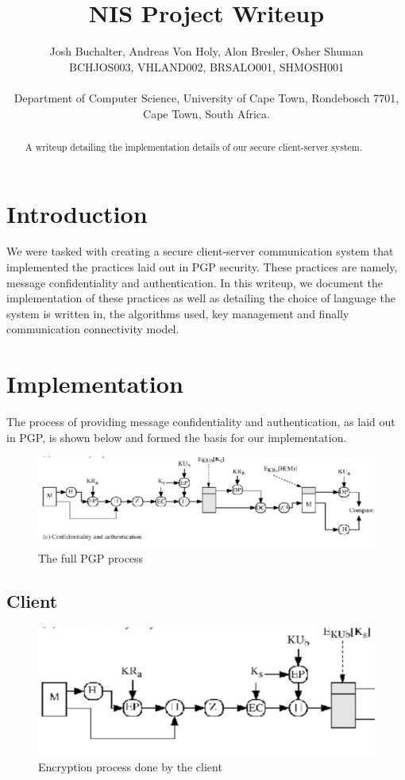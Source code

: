 \documentclass[a4paper,10pt]{article}
\title{\bf NIS Project Writeup}
\author{Josh Buchalter, Andreas Von Holy, Alon Bresler, Osher Shuman \\
BCHJOS003, VHLAND002, BRSALO001, SHMOSH001 \\\\
Department of Computer Science, University of Cape Town, Rondebosch 7701, \\Cape Town, South Africa.}
\begin{document}
\maketitle

\begin{abstract}
A writeup detailing the implementation details of our secure client-server system.
\end{abstract}

\section{Introduction}
We were tasked with creating a secure client-server communication system that implemented the practices laid out in PGP security. These practices are namely, message confidentiality and authentication. In this writeup, we document the implementation of these practices as well as detailing the choice of language the system is written in, the algorithms used, key management and finally communication connectivity model.
\section{Implementation}
The process of providing message confidentiality and authentication, as laid out in PGP, is shown below and formed the basis for our implementation.

\begin{figure}[H]
\centering
\includegraphics[width=0.7\linewidth]{PGP_Auth_Conf}
\caption{The full PGP process}
\label{fig:PGP_Auth_Conf}
\end{figure}

\subsection{Client}
\begin{figure}[H]
\centering
\includegraphics[width=0.7\linewidth]{Client_Side}
\caption{Encryption process done by the client}
\label{fig:Client_Side}
\end{figure}
\end{document}
